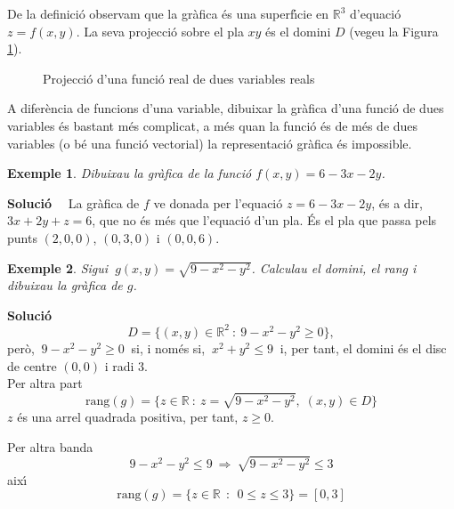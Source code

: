 \documentclass[12pt]{article}
\newcommand{\solucio}{\textbf{Soluci{\'o}}\ \ }
\newtheorem{exemple}{Exemple}[subsection]
\newcommand{\R}{\mathbb{R}}
\begin{document}
De la definici{\'o} observam que la gr{\`a}fica {\'e}s una superf{\'\i}cie en $\R^3$
d'equaci{\'o} $z=f(x,y)$. La seva projecci{\'o} sobre el pla
$xy$ {\'e}s el domini $D$ (vegeu la Figura \ref{projeccioFDV}).

\begin{figure}[h!]
\begin{center}

\vspace{-.4cm}
\end{center}\caption{Projecci{\'o} d'una funci{\'o} real de dues variables reals}\label{projeccioFDV}
\end{figure}


A difer{\`e}ncia de funcions d'una variable, dibuixar la gr{\`a}fica d'una funci{\'o} de dues
variables {\'e}s bastant m{\'e}s complicat, a m{\'e}s quan la funci{\'o} {\'e}s de m{\'e}s de dues
variables (o b{\'e} una funci{\'o} vectorial) la representaci{\'o} gr{\`a}fica {\'e}s impossible.

\vspace*{0.4cm}
\begin{exemple}
Dibuixau la gr{\`a}fica de la funci{\'o} $f(x,y)=6-3x-2y$.
\end{exemple}

\solucio
La gr{\`a}fica de $f$ ve donada per l'equaci{\'o} $z=6-3x-2y$, {\'e}s a
dir, $3x+2y+z=6$, que no {\'e}s m{\'e}s que l'equaci{\'o} d'un pla. \'Es
el pla que passa pels punts $(2,0,0)$, $(0,3,0)$ i $(0,0,6)$.



\vspace*{0.4cm}
\begin{exemple}
Sigui $\ g(x,y)=\sqrt{9-x^2-y^2}$. Calculau el domini, el rang i dibuixau
la gr{\`a}fica de $g$.
\end{exemple}

\vspace{0.4 cm}
\solucio
\[
  D = \{(x,y)\in \R^2\ :\ 9-x^2-y^2\geq 0
  \},
\]
per{\`o}, $\ 9-x^2-y^2\geq 0\ $ si, i nom{\'e}s si, $\ x^2+y^2 \leq 9\ $ i,
per tant, el domini {\'e}s el disc de centre $(0,0)$ i radi 3.\\

Per altra part
\[
\mbox{rang}(g)=\{z\in\R\ :\ z=\sqrt{9-x^2-y^2},\; (x,y)\in D
\}
\]
$z$ {\'e}s una arrel quadrada positiva, per tant, $z\geq 0$.

\noindent Per altra banda
\[
9-x^2 - y^2 \leq 9 \ \Longrightarrow\ \sqrt{9-x^2-y^2}\leq 3
\]
aix{\'\i}
\[
\mbox{rang}(g)= \{z\in\R\,\; :\,\; 0\leq z\leq 3   \}=[ 0,3 ]
\]
\end{document}
